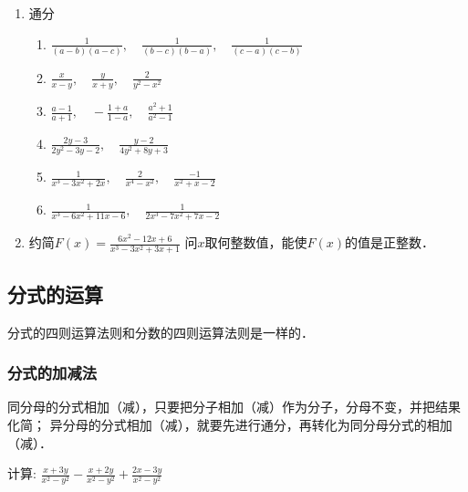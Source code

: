 \begin{ex}
\begin{enumerate}
\item  通分
\begin{enumerate}
\item  $\frac{1}{(a-b)(a-c)},\quad  \frac{1}{(b-c)(b-a)}, \quad \frac{1}{(c-a)(c-b)}$
\item $\frac{x}{x-y},\quad  \frac{y}{x+y}, \quad \frac{2}{y^{2}-x^{2}}$
\item  $\frac{a-1}{a+1},\quad -\frac{1+a}{1-a}, \quad \frac{a^{2}+1}{a^{2}-1}$
\item  $\frac{2 y-3}{2 y^{2}-3 y-2}, \quad \frac{y-2}{4 y^{2}+8 y+3}$
\item  $\frac{1}{x^{3}-3 x^{2}+2 x}, \quad \frac{2}{x^{4}-x^{2}}, \quad \frac{-1}{x^{2}+x-2}$
\item  $\frac{1}{x^{3}-6 x^{2}+11 x-6}, \quad \frac{1}{2 x^{3}-7 x^{2}+7 x-2}$
\end{enumerate}

\item 约简$F(x)=\frac{6x^2-12x+6}{x^3-3x^2+3x+1}$ 问$x$取何整数值，能使$F(x)$的值是正整数．
\end{enumerate}
\end{ex}

\subsection{分式的运算}
分式的四则运算法则和分数的四则运算法则是一样的．

\subsubsection{分式的加减法}

同分母的分式相加（减），只要把分子相加（减）作为分子，分母不变，并把结果化简；
异分母的分式相加（减），就要先进行通分，再转化为同分母分式的相加（减）．

\begin{example}
    计算: $\frac{x+3 y}{x^{2}-y^{2}}-\frac{x+2 y}{x^{2}-y^{2}}+\frac{2x-3y}{x^2-y^2}$
\end{example}


